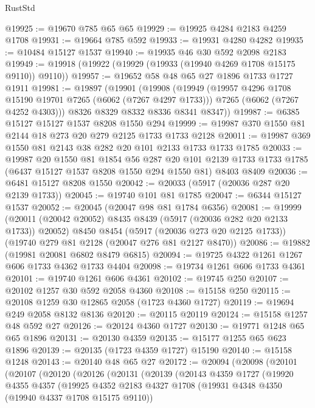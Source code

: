 \begin{lexlean}{RustStd}
\begin{coremodule}
@19925 := @19670 @785 @65 @65
@19929 := @19925 @4284 @2183 @4259 @1708
@19931 := @19664 @785 @592
@19933 := @19931 @4280 @4282
@19935 := @10484 @15127 @1537
@19940 := @19935 @46 @30 @592 @2098 @2183
@19949 := @19918 (@19922 (@19929 (@19933 (@19940 @4269 @1708 @15175 @9110)) @9110))
@19957 := @19652 @58 @48 @65 @27 @1896 @1733 @1727 @1911
@19981 := @19897
    (@19901
      (@19908
        (@19949
          (@19957 @4296 @1708 @15190 @19701 @7265 (@6062 (@7267 @4297 @1733)))
          @7265
          (@6062 (@7267 @4252 @4303)))
        @8326
        @8329
        @8332
        @8336
        @8341
        @8347))
@19987 := @6385 @15127 @15127 @1537 @8208 @1550 @294
@19999 := @19987 @370 @1550 @81 @2144 @18 @273 @20 @279 @2125 @1733 @1733 @2128
@20011 := @19987 @369 @1550 @81 @2143 @38 @282 @20 @101 @2133 @1733 @1733 @1785
@20033 := @19987
    @20
    @1550
    @81
    @1854
    @56
    @287
    @20
    @101
    @2139
    @1733
    @1733
    @1785
    (@6437 @15127 @1537 @8208 @1550 @294 @1550 @81)
    @8403
    @8409
@20036 := @6481 @15127 @8208 @1550
@20042 := @20033 (@5917 (@20036 @287 @20 @2139 @1733))
@20045 := @19740 @101 @81 @1785
@20047 := @6344 @15127 @1537
@20052 := @20045 (@20047 @98 @81 @1784 @6356)
@20081 := @19999
    (@20011 (@20042 @20052) @8435 @8439 (@5917 (@20036 @282 @20 @2133 @1733)) @20052)
    @8450
    @8454
    (@5917 (@20036 @273 @20 @2125 @1733))
    (@19740 @279 @81 @2128 (@20047 @276 @81 @2127 @8470))
@20086 := @19882 (@19981 @20081 @6802 @8479 @6815)
@20094 := @19725 @4322 @1261 @1267 @606 @1733 @4362 @1733 @4404
@20098 := @19734 @1261 @606 @1733 @4361
@20101 := @19740 @1261 @606 @4361
@20102 := @19745 @250
@20107 := @20102 @1257 @30 @592 @2058 @4360
@20108 := @15158 @250
@20115 := @20108 @1259 @30 @12865 @2058 (@1723 @4360 @1727)
@20119 := @19694 @249 @2058 @8132 @8136
@20120 := @20115 @20119
@20124 := @15158 @1257 @48 @592 @27
@20126 := @20124 @4360 @1727
@20130 := @19771 @1248 @65 @65 @1896
@20131 := @20130 @4359
@20135 := @15177 @1255 @65 @623 @1896
@20139 := @20135 (@1723 @4359 @1727) @15190
@20140 := @15158 @1248
@20143 := @20140 @48 @65 @27
@20172 := @20094
    (@20098
      (@20101
        (@20107
          (@20120
            (@20126
              (@20131
                (@20139
                  (@20143
                    @4359
                    @1727
                    (@19920
                      @4355
                      @4357
                      (@19925
                        @4352
                        @2183
                        @4327
                        @1708
                        (@19931 @4348 @4350 (@19940 @4337 @1708 @15175 @9110))

\end{coremodule}
\end{lexlean}
